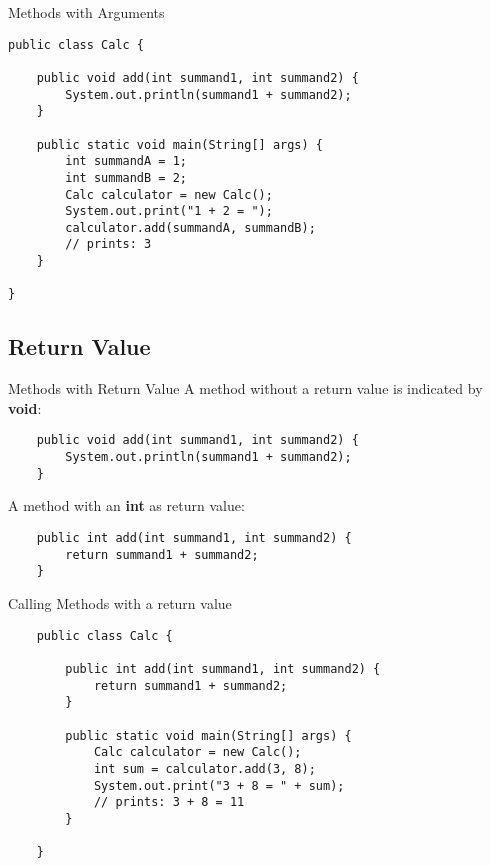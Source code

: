 \begin{frame}[fragile]{Methods with Arguments}

\begin{lstlisting}
public class Calc {

    public void add(int summand1, int summand2) {
        System.out.println(summand1 + summand2);
    }
        
    public static void main(String[] args) {
        int summandA = 1;
        int summandB = 2;
        Calc calculator = new Calc();
        System.out.print("1 + 2 = ");
        calculator.add(summandA, summandB); 
        // prints: 3
    }
    
} \end{lstlisting}
\end{frame}

\subsection{Return Value}
\begin{frame}[fragile]{Methods with Return Value}
    A method without a return value is indicated by \textbf{void}:
    \begin{lstlisting}
    public void add(int summand1, int summand2) {
        System.out.println(summand1 + summand2);
    }\end{lstlisting}
    A method with an \textbf{int} as return value:
    \begin{lstlisting}
    public int add(int summand1, int summand2) {
        return summand1 + summand2;
    } \end{lstlisting}
\end{frame}

\begin{frame}[fragile]{Calling Methods with a return value}
    \begin{lstlisting}
    public class Calc {
    
        public int add(int summand1, int summand2) {
            return summand1 + summand2;
        }
        
        public static void main(String[] args) {
            Calc calculator = new Calc();
            int sum = calculator.add(3, 8);
            System.out.print("3 + 8 = " + sum); 
            // prints: 3 + 8 = 11
        }
        
    } \end{lstlisting}
\end{frame}

